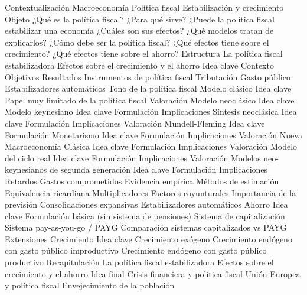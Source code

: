 \documentclass{nuevotema}
\begin{document}
\begin{esquema}[enumerate]
	\1[] 
		\2 Contextualización
			\3 Macroeconomía
			\3 Política fiscal
			\3 Estabilización y crecimiento
		\2 Objeto
			\3 ¿Qué es la política fiscal?
			\3 ¿Para qué sirve?
			\3 ¿Puede la política fiscal estabilizar una economía
			\3 ¿Cuáles son sus efectos?
			\3 ¿Qué modelos tratan de explicarlos?
			\3 ¿Cómo debe ser la política fiscal?
			\3 ¿Qué efectos tiene sobre el crecimiento?
			\3 ¿Qué efectos tiene sobre el ahorro?
		\2 Estructura
			\3 La política fiscal estabilizadora
			\3 Efectos sobre el crecimiento y el ahorro
	\1 
		\2 Idea clave
			\3 Contexto
			\3 Objetivos
			\3 Resultados
		\2 Instrumentos de política fiscal
			\3 Tributación
			\3 Gasto público
			\3 Estabilizadores automáticos
			\3 Tono de la política fiscal
		\2 Modelo clásico
			\3 Idea clave
			\3 Papel muy limitado de la política fiscal
			\3 Valoración
		\2 Modelo neoclásico
			\3 Idea clave
		\2 Modelo keynesiano
			\3 Idea clave
			\3 Formulación
			\3 Implicaciones
		\2 Síntesis neoclásica
			\3 Idea clave
			\3 Formulación
			\3 Implicaciones
			\3 Valoración
		\2 Mundell-Fleming
			\3 Idea clave
			\3 Formulación
		\2 Monetarismo
			\3 Idea clave
			\3 Formulación
			\3 Implicaciones
			\3 Valoración
		\2 Nueva Macroeconomía Clásica
			\3 Idea clave
			\3 Formulación
			\3 Implicaciones
			\3 Valoración
		\2 Modelo del ciclo real
			\3 Idea clave
			\3 Formulación
			\3 Implicaciones
			\3 Valoración
		\2 Modelos neo-keynesianos de segunda generación
			\3 Idea clave
			\3 Formulación
			\3 Implicaciones
			\3 Retardos
			\3 Gastos comprometidos
		\2 Evidencia empírica
			\3 Métodos de estimación
			\3 Equivalencia ricardiana
			\3 Multiplicadores
			\3 Factores coyunturales
			\3 Importancia de la previsión
			\3 Consolidaciones expansivas
			\3 Estabilizadores automáticos
	\1 
		\2 Ahorro
			\3 Idea clave
			\3 Formulación básica (sin sistema de pensiones)
			\3 Sistema de capitalización
			\3 Sistema pay-as-you-go / PAYG
			\3 Comparación sistemas capitalizados vs PAYG
			\3 Extensiones
		\2 Crecimiento
			\3 Idea clave
			\3 Crecimiento exógeno
			\3 Crecimiento endógeno con gasto público improductivo
			\3 Crecimiento endógeno con gasto público productivo
	\1 
		\2 Recapitulación
			\3 La política fiscal estabilizadora
			\3 Efectos sobre el crecimiento y el ahorro
		\2 Idea final
			\3 Crisis financiera y política fiscal
			\3 Unión Europea y política fiscal
			\3 Envejecimiento de la población

\end{esquema}
\end{document}
